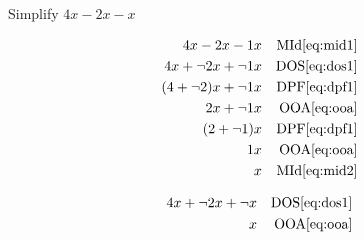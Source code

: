 \begin{example}[id:20141106-152020] \label{20141106-152020}  \hfill \\

Simplify $4x-2x-x$

\soln

\solnsteps
\begin{align*}
4x-2x-1x && \text{MId} \eqref{eq:mid1} \\
4x+\neg 2x + \neg 1 x && \text{DOS} \eqref{eq:dos1} \\
(4+\neg 2)x + \neg 1x && \text{DPF} \eqref{eq:dpf1} \\ 
2x+\neg 1x && \text{OOA} \eqref{eq:ooa} \\
(2+\neg 1)x && \text{DPF} \eqref{eq:dpf1} \\ 
1x && \text{OOA} \eqref{eq:ooa} \\
x && \text{MId} \eqref{eq:mid2}  
\end{align*}

\soln

\lesssteps
\begin{align*}
4x + \neg 2x + \neg x && \text{DOS} \eqref{eq:dos1} \\
x && \text{OOA} \eqref{eq:ooa} 
\end{align*}
\end{example}

